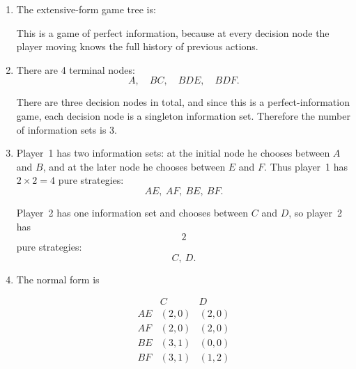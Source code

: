 \documentclass[12pt,a4paper]{article}
\begin{document}
\begin{enumerate}[label=\alph*.]

\item The extensive-form game tree is:

\begin{center}
\end{center}

This is a game of perfect information, because at every decision node the player moving knows the full history of previous actions.

\item There are 4 terminal nodes:
\[
A,\quad BC,\quad BDE,\quad BDF.
\]

There are three decision nodes in total, and since this is a perfect-information game, each decision node is a singleton information set. Therefore the number of information sets is 3.

\item Player~1 has two information sets: at the initial node he chooses between $A$ and $B$, and at the later node he chooses between $E$ and $F$. Thus player~1 has \(2\times 2 = 4\) pure strategies:
\[
AE,\ AF,\ BE,\ BF.
\]

Player~2 has one information set and chooses between $C$ and $D$, so player~2 has
\[
\boxed{2}
\]
pure strategies:
\[
C,\ D.
\]

\item The normal form is

\[
\begin{array}{c|cc}
 & C & D\\
\hline
AE & (2,0) & (2,0)\\
AF & (2,0) & (2,0)\\
BE & (3,1) & (0,0)\\
BF & (3,1) & (1,2)
\end{array}
\]


\end{enumerate}
\end{document}
